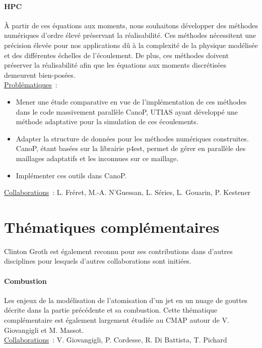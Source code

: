 \documentclass[12pt]{article}
\begin{document}
\paragraph{HPC \\ }  À partir de ces équations aux moments, nous souhaitons développer des méthodes numériques d'ordre élevé préservant la réalisabilité. Ces méthodes nécessitent une précision élevée pour nos applications dû à la complexité de la physique modélisée et des différentes échelles de l'écoulement. De plus, ces méthodes doivent préserver la réalisabilité afin que les équations aux moments discrétisées demeurent bien-posées. \\
%
\underline{Problématiques}~:
\begin{itemize}
\item Mener une étude comparative en vue de l'implémentation de ces méthodes dans le code massivement parallèle CanoP, UTIAS ayant développé une méthode adaptative pour la simulation de ces écoulements.
\item Adapter la structure de données pour les méthodes numériques construites. CanoP, étant basées sur la librairie p4est, permet de gérer en parallèle des maillages adaptatifs et les inconnues sur ce maillage. %
\item Implémenter ces outils dans CanoP.
\end{itemize}
\underline{Collaborations}~: L. Fréret, M.-A. N'Guessan, L. Séries, L. Gouarin, P. Kestener


\section*{Thématiques complémentaires}
Clinton Groth est également reconnu pour ses contributions dans d'autres disciplines pour lesquels d'autres collaborations sont initiées.

\paragraph{Combustion}
Les enjeux de la modélisation de l'atomisation d'un jet en un nuage de gouttes décrite dans la partie précédente et sa combustion. Cette thématique complémentaire est également largement étudiée au CMAP autour de V. Giovangigli et M. Massot. \\
%
\underline{Collaborations}~: V. Giovangigli, P. Cordesse, R. Di Battista, T. Pichard 
\end{document}

